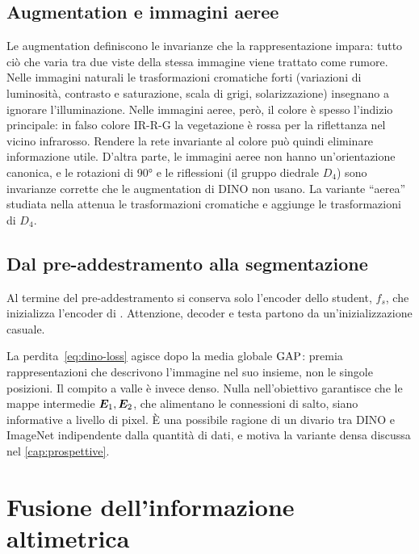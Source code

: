 \subsection{Augmentation e immagini aeree}
\label{sec:augmentation-teoria}

Le augmentation definiscono le invarianze che la rappresentazione impara: tutto ciò che varia
tra due viste della stessa immagine viene trattato come rumore. Nelle immagini naturali le
trasformazioni cromatiche forti (variazioni di luminosità, contrasto e saturazione, scala di
grigi, solarizzazione) insegnano a ignorare l'illuminazione. Nelle immagini aeree, però, il
colore è spesso l'indizio principale: in falso colore IR-R-G la vegetazione è rossa per la
riflettanza nel vicino infrarosso. Rendere la rete invariante al colore può quindi eliminare
informazione utile. D'altra parte, le immagini aeree non hanno un'orientazione canonica, e le
rotazioni di \ang{90} e le riflessioni (il gruppo diedrale $D_4$) sono invarianze corrette che le
augmentation di DINO non usano. La variante \enquote{aerea} studiata nella  attenua le
trasformazioni cromatiche e aggiunge le trasformazioni di $D_4$.

\subsection{Dal pre-addestramento alla segmentazione}

Al termine del pre-addestramento si conserva solo l'encoder dello student, $f_s$, che inizializza
l'encoder di \maresunet{}. Attenzione, decoder e testa partono da un'inizializzazione casuale.

\begin{osservazione}
\label{oss:globale-denso}
La perdita~\eqref{eq:dino-loss} agisce dopo la media globale $\operatorname{GAP}$: premia rappresentazioni
che descrivono l'immagine nel suo insieme, non le singole posizioni. Il compito a valle è invece
denso. Nulla nell'obiettivo garantisce che le mappe intermedie $\bm{E}_1,\bm{E}_2$, che
alimentano le connessioni di salto, siano informative a livello di pixel. È una possibile
ragione di un divario tra DINO e ImageNet indipendente dalla quantità di dati, e motiva la
variante densa discussa nel \cref{cap:prospettive}.
\end{osservazione}

\section{Fusione dell'informazione altimetrica}
\label{sec:ndsm}

